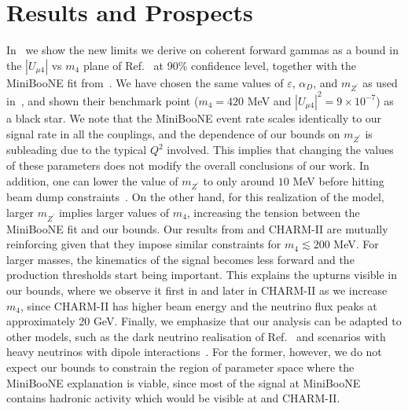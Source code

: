 \section{Results and Prospects}

In~ we show the new limits we derive on coherent forward gammas as a bound in the $|U_{\mu 4}|$ vs $m_4$ plane of Ref.~\cite{Bertuzzo:2018itn} at 90\% confidence level, together with the MiniBooNE fit from~\cite{Bertuzzo:2018itn}.
We have chosen the same values of $\varepsilon$, $\alpha_D$, and $m_{Z^\prime}$ as used in~\cite{Bertuzzo:2018itn}, and shown their benchmark point ($m_4 = 420$ MeV and $|U_{\mu 4}|^2 = 9 \times 10^{-7}$) as a black star.
We note that the MiniBooNE event rate scales identically to our signal rate in all the couplings, and the dependence of our bounds on $m_{Z^\prime}$ is subleading due to the typical $Q^2$ involved.
This implies that changing the values of these parameters does not modify the overall conclusions of our work. In addition, one can lower the value of $m_{Z^\prime}$ to only around $10$ MeV before hitting beam dump constraints~\cite{Bauer:2018onh}. 
On the other hand, for this realization of the model, larger $m_{Z^\prime}$ implies larger values of $m_4$, increasing the tension between the MiniBooNE fit and our bounds.
Our results from \minerva and CHARM-II are mutually reinforcing given that 
they impose similar constraints for $m_4 \lesssim 200 $ MeV. For larger masses, the kinematics of the signal becomes less forward and the production thresholds start being important. This explains the upturns visible in our bounds, where we observe it first in \minerva and later in CHARM-II as we increase $m_4$, since CHARM-II has higher beam energy and the neutrino flux peaks at approximately 20 GeV. Finally, we emphasize that our analysis can be adapted to other models, such as the dark neutrino realisation of Ref.~\cite{Ballett:2018ynz} and scenarios with heavy neutrinos with dipole interactions~\cite{Magill:2018jla}. For the former, however, we do not expect our bounds to constrain the region of parameter space where the MiniBooNE explanation is viable, since most of the signal at MiniBooNE contains hadronic activity which would be visible at \minerva and CHARM-II.


